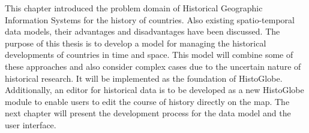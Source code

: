 \vspace{2.0em}

This chapter introduced the problem domain of Historical Geographic Information Systems for the history of countries. Also existing spatio-temporal data models, their advantages and disadvantages have been discussed. The purpose of this thesis is to develop a model for managing the historical developments of countries in time and space. This model will combine some of these approaches and also consider complex cases due to the uncertain nature of historical research. It will be implemented as the foundation of HistoGlobe. Additionally, an editor for historical data is to be developed as a new HistoGlobe module to enable users to edit the course of history directly on the map. The next chapter will present the development process for the data model and the user interface.

